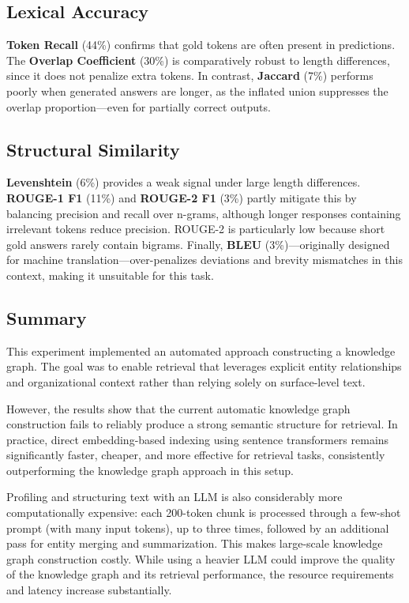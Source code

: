 \subsection{Lexical Accuracy}
	\textbf{Token Recall} (44\%) confirms that gold tokens are often present in predictions. The \textbf{Overlap Coefficient} (30\%) is comparatively robust to length differences, since it does not penalize extra tokens. In contrast, \textbf{Jaccard} (7\%) performs poorly when generated answers are longer, as the inflated union suppresses the overlap proportion—even for partially correct outputs.

\subsection{Structural Similarity}
	\textbf{Levenshtein} (6\%) provides a weak signal under large length differences. \textbf{ROUGE-1 F1} (11\%) and \textbf{ROUGE-2 F1} (3\%) partly mitigate this by balancing precision and recall over n-grams, although longer responses containing irrelevant tokens reduce precision. ROUGE-2 is particularly low because short gold answers rarely contain bigrams. Finally, \textbf{BLEU} (3\%)—originally designed for machine translation—over-penalizes deviations and brevity mismatches in this context, making it unsuitable for this task.

\subsection{Summary}
This experiment implemented an automated approach constructing a knowledge graph. The goal was to enable retrieval that leverages explicit entity relationships and organizational context rather than relying solely on surface-level text.

However, the results show that the current automatic knowledge graph construction fails to reliably produce a strong semantic structure for retrieval. In practice, direct embedding-based indexing using sentence transformers remains significantly faster, cheaper, and more effective for retrieval tasks, consistently outperforming the knowledge graph approach in this setup.

Profiling and structuring text with an LLM is also considerably more computationally expensive: each 200-token chunk is processed through a few-shot prompt (with many input tokens), up to three times, followed by an additional pass for entity merging and summarization. This makes large-scale knowledge graph construction costly. While using a heavier LLM could improve the quality of the knowledge graph and its retrieval performance, the resource requirements and latency increase substantially.

